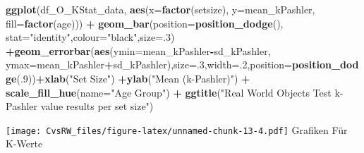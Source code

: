 \documentclass[
]{article}
\newenvironment{Shaded}{\begin{snugshade}}{\end{snugshade}}
\newcommand{\DataTypeTok}[1]{\textcolor[rgb]{0.13,0.29,0.53}{#1}}
\newcommand{\DecValTok}[1]{\textcolor[rgb]{0.00,0.00,0.81}{#1}}
\newcommand{\FloatTok}[1]{\textcolor[rgb]{0.00,0.00,0.81}{#1}}
\newcommand{\KeywordTok}[1]{\textcolor[rgb]{0.13,0.29,0.53}{\textbf{#1}}}
\newcommand{\NormalTok}[1]{#1}
\newcommand{\OperatorTok}[1]{\textcolor[rgb]{0.81,0.36,0.00}{\textbf{#1}}}
\newcommand{\StringTok}[1]{\textcolor[rgb]{0.31,0.60,0.02}{#1}}
\begin{document}
\begin{Shaded}
\begin{Highlighting}[]
\KeywordTok{ggplot}\NormalTok{(df_O_KStat_data, }\KeywordTok{aes}\NormalTok{(}\DataTypeTok{x=}\KeywordTok{factor}\NormalTok{(setsize), }\DataTypeTok{y=}\NormalTok{mean_kPashler, }\DataTypeTok{fill=}\KeywordTok{factor}\NormalTok{(age))) }\OperatorTok{+}\StringTok{ }\KeywordTok{geom_bar}\NormalTok{(}\DataTypeTok{position=}\KeywordTok{position_dodge}\NormalTok{(), }\DataTypeTok{stat=}\StringTok{"identity"}\NormalTok{,}\DataTypeTok{colour=}\StringTok{"black"}\NormalTok{,}\DataTypeTok{size=}\NormalTok{.}\DecValTok{3}\NormalTok{) }\OperatorTok{+}\KeywordTok{geom_errorbar}\NormalTok{(}\KeywordTok{aes}\NormalTok{(}\DataTypeTok{ymin=}\NormalTok{mean_kPashler}\OperatorTok{-}\NormalTok{sd_kPashler, }\DataTypeTok{ymax=}\NormalTok{mean_kPashler}\OperatorTok{+}\NormalTok{sd_kPashler),}\DataTypeTok{size=}\NormalTok{.}\DecValTok{3}\NormalTok{,}\DataTypeTok{width=}\NormalTok{.}\DecValTok{2}\NormalTok{,}\DataTypeTok{position=}\KeywordTok{position_dodge}\NormalTok{(.}\DecValTok{9}\NormalTok{))}\OperatorTok{+}\KeywordTok{xlab}\NormalTok{(}\StringTok{"Set Size"}\NormalTok{) }\OperatorTok{+}\KeywordTok{ylab}\NormalTok{(}\StringTok{"Mean (k-Pashler)"}\NormalTok{) }\OperatorTok{+}\StringTok{ }\KeywordTok{scale_fill_hue}\NormalTok{(}\DataTypeTok{name=}\StringTok{"Age Group"}\NormalTok{) }\OperatorTok{+}\StringTok{ }\KeywordTok{ggtitle}\NormalTok{(}\StringTok{"Real World Objects Test k-Pashler value results per set size"}\NormalTok{)}
\end{Highlighting}
\end{Shaded}

\texttt{[image: CvsRW\_files/figure-latex/unnamed-chunk-13-4.pdf]}
Grafiken Für K-Werte

\begin{Shaded}
\end{Shaded}
\end{document}
